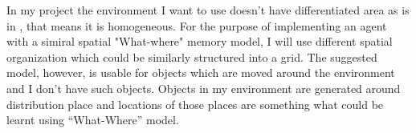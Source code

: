 In my project the environment I want to use doesn’t have differentiated area as is in \cite{Brom:placeandobjects}, that means it is homogeneous. For the purpose of implementing an agent with a simiral spatial "What-where" memory model, I will use different spatial organization which could be similarly structured into a grid.  The suggested model, however, is usable for objects which are moved around the environment and I don’t have such objects. Objects in my environment are generated around distribution place and locations of those places are something what could be learnt using “What-Where” model. 